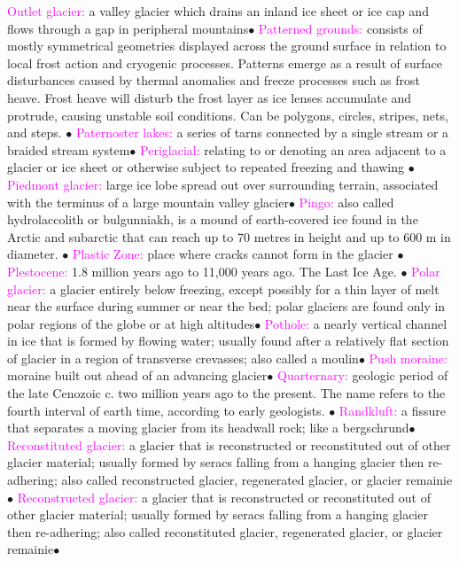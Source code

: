 \documentclass{article}
\newcommand{\ddd}{$\bullet$}
\newcommand{\pink}[1]{\textcolor{magenta}{#1}}
\newcommand{\vocab}[1]{{\pink{#1}}}
\begin{document}
\begin{multicols*}{4}
		\vocab{        Outlet glacier: } a valley glacier which drains an inland ice sheet or ice cap and flows through a gap in peripheral mountains\ddd
		\vocab{        Patterned grounds: } consists of mostly symmetrical geometries displayed across the ground surface in relation to local frost action and cryogenic processes. Patterns emerge as a result of surface disturbances caused by thermal anomalies and freeze processes such as frost heave. Frost heave will disturb the frost layer as ice lenses accumulate and protrude, causing unstable soil conditions. Can be polygons, circles, stripes, nets, and steps. \ddd
		\vocab{        Paternoster lakes: } a series of tarns connected by a single stream or a braided stream system\ddd
		\vocab{        Periglacial: } relating to or denoting an area adjacent to a glacier or ice sheet or otherwise subject to repeated freezing and thawing \ddd        
		\vocab{        Piedmont glacier: } large ice lobe spread out over surrounding terrain, associated with the terminus of a large mountain valley glacier\ddd
		\vocab{        Pingo: } also called hydrolaccolith or bulgunniakh, is a mound of earth-covered ice found in the Arctic and subarctic that can reach up to 70 metres in height and up to 600 m in diameter. \ddd       
		\vocab{Plastic Zone: } place where cracks cannot form in the glacier \ddd
		\vocab{Plestocene: } 1.8 million years ago to 11,000 years ago. The Last Ice Age.  \ddd
		\vocab{        Polar glacier: } a glacier entirely below freezing, except possibly for a thin layer of melt near the surface during summer or near the bed; polar glaciers are found only in polar regions of the globe or at high altitudes\ddd
		\vocab{        Pothole: } a nearly vertical channel in ice that is formed by flowing water; usually found after a relatively flat section of glacier in a region of transverse crevasses; also called a moulin\ddd
		\vocab{        Push moraine: } moraine built out ahead of an advancing glacier\ddd
		\vocab{Quarternary: } geologic period of the late Cenozoic c. two million years ago to the present. The name refers to the fourth interval of earth time, according to early geologists.  \ddd
		\vocab{        Randkluft: } a fissure that separates a moving glacier from its headwall rock; like a bergschrund\ddd
		\vocab{        Reconstituted glacier: } a glacier that is reconstructed or reconstituted out of other glacier material; usually formed by seracs falling from a hanging glacier then re-adhering; also called reconstructed glacier, regenerated glacier, or glacier remainie\ddd
		\vocab{        Reconstructed glacier: } a glacier that is reconstructed or reconstituted out of other glacier material; usually formed by seracs falling from a hanging glacier then re-adhering; also called reconstituted glacier, regenerated glacier, or glacier remainie\ddd

\end{multicols*}
\end{document}
